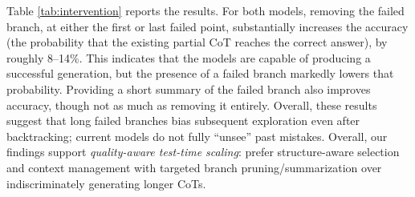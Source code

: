 Table \ref{tab:intervention} reports the results. For both models, removing the failed branch, at either the first or last failed point, substantially increases the accuracy (the probability that the existing partial CoT reaches the correct answer), by roughly 8–14\%. This indicates that the models are capable of producing a successful generation, but the presence of a failed branch markedly lowers that probability. Providing a short summary of the failed branch also improves accuracy, though not as much as removing it entirely. Overall, these results suggest that long failed branches bias subsequent exploration even after backtracking; current models do not fully “unsee” past mistakes. Overall, our findings support \emph{quality-aware test-time scaling}: prefer structure-aware selection \citep{yao2023tree, bi2024forest} and context management with targeted branch pruning/summarization \citep{snell2024scaling, hao2025rl, liao2025fractured} over indiscriminately generating longer CoTs.








